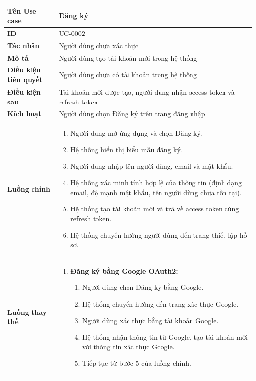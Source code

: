 {
\small
\renewcommand{\arraystretch}{1.15}

\begin{tabularx}{\textwidth}{|>{\raggedright\arraybackslash}p{3.5cm}|>{\raggedright\arraybackslash}X|}
\hline
\textbf{Tên Use case} & Đăng ký \\
\hline
\textbf{ID} & UC-0002 \\
\hline
\textbf{Tác nhân} & Người dùng chưa xác thực \\
\hline
\textbf{Mô tả} & Người dùng tạo tài khoản mới trong hệ thống \\
\hline
\textbf{Điều kiện tiên quyết} & Người dùng chưa có tài khoản trong hệ thống \\
\hline
\textbf{Điều kiện sau} & Tài khoản mới được tạo, người dùng nhận access token và refresh token \\
\hline
\textbf{Kích hoạt} & Người dùng chọn Đăng ký trên trang đăng nhập \\
\hline
\textbf{Luồng chính} &
\begin{enumerate}
    \item Người dùng mở ứng dụng và chọn Đăng ký.
    \item Hệ thống hiển thị biểu mẫu đăng ký.
    \item Người dùng nhập tên người dùng, email và mật khẩu.
    \item Hệ thống xác minh tính hợp lệ của thông tin (định dạng email, độ mạnh mật khẩu, tên người dùng chưa tồn tại).
    \item Hệ thống tạo tài khoản mới và trả về access token cùng refresh token.
    \item Hệ thống chuyển hướng người dùng đến trang thiết lập hồ sơ.
\end{enumerate} \\
\hline
\textbf{Luồng thay thế} &
\begin{enumerate}
    \item \textbf{Đăng ký bằng Google OAuth2:}
    \begin{enumerate}
        \item[3A.] Người dùng chọn Đăng ký bằng Google.
        \item[4A.] Hệ thống chuyển hướng đến trang xác thực Google.
        \item[5A.] Người dùng xác thực bằng tài khoản Google.
        \item[6A.] Hệ thống nhận thông tin từ Google, tạo tài khoản mới với thông tin xác thực Google.
        \item[7A.] Tiếp tục từ bước 5 của luồng chính.

\end{enumerate}
\end{enumerate}
\end{tabularx}}
